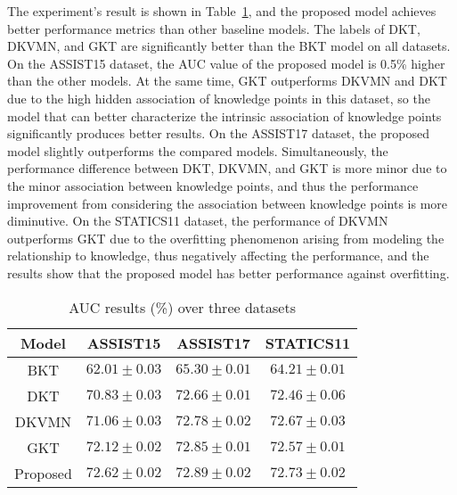 The experiment's result is shown in Table~\ref{tbl:ch3-tb2}, and the proposed model achieves better performance metrics than other baseline models. The labels of DKT, DKVMN, and GKT are significantly better than the BKT model on all datasets. On the ASSIST15 dataset, the AUC value of the proposed model is 0.5\% higher than the other models. At the same time, GKT outperforms DKVMN and DKT due to the high hidden association of knowledge points in this dataset, so the model that can better characterize the intrinsic association of knowledge points significantly produces better results. On the ASSIST17 dataset, the proposed model slightly outperforms the compared models. Simultaneously, the performance difference between DKT, DKVMN, and GKT is more minor due to the minor association between knowledge points, and thus the performance improvement from considering the association between knowledge points is more diminutive. On the STATICS11 dataset, the performance of DKVMN outperforms GKT due to the overfitting phenomenon arising from modeling the relationship to knowledge, thus negatively affecting the performance, and the results show that the proposed model has better performance against overfitting.

\begin{table}[htbp!]
    \centering
    \caption{AUC results (\%) over three datasets}\label{tbl:ch3-tb2}
    \begin{tabular}{cccc}
        \toprule
        Model    & ASSIST15                    & ASSIST17                   & STATICS11                  \\
        \midrule
        BKT      & \(62.01\pm 0.03 \)          & \(65.30\pm 0.01\)          & \(64.21\pm 0.01\)          \\
        DKT      & \(70.83\pm 0.03 \)          & \(72.66\pm 0.01\)          & \(72.46\pm 0.06\)          \\
        DKVMN    & \(71.06\pm 0.03 \)          & \(72.78\pm 0.02\)          & \(72.67\pm 0.03\)          \\
        GKT      & \(72.12\pm 0.02 \)          & \(72.85\pm 0.01\)          & \(72.57\pm 0.01\)          \\
        \midrule
        Proposed & \(\mathbf{72.62\pm 0.02} \) & \(\mathbf{72.89\pm 0.02}\) & \(\mathbf{72.73\pm 0.02}\) \\
        \bottomrule
    \end{tabular}
\end{table}
